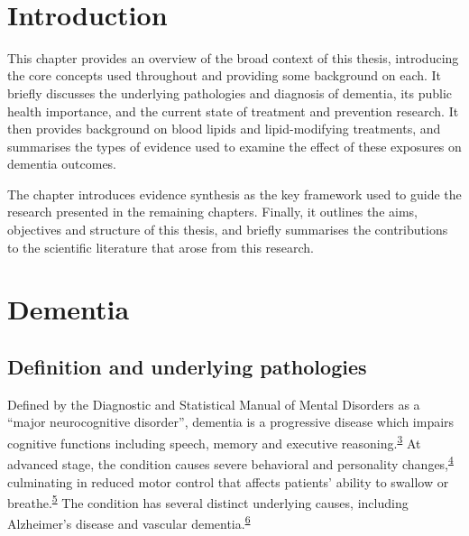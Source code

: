 \documentclass[a4paper, twoside]{templates/ociamthesis}
\begin{document}
~

\hypertarget{introduction}{%
\section{Introduction}\label{introduction}}

This chapter provides an overview of the broad context of this thesis, introducing the core concepts used throughout and providing some background on each. It briefly discusses the underlying pathologies and diagnosis of dementia, its public health importance, and the current state of treatment and prevention research. It then provides background on blood lipids and lipid-modifying treatments, and summarises the types of evidence used to examine the effect of these exposures on dementia outcomes.

The chapter introduces evidence synthesis as the key framework used to guide the research presented in the remaining chapters. Finally, it outlines the aims, objectives and structure of this thesis, and briefly summarises the contributions to the scientific literature that arose from this research.

\hypertarget{dementia}{%
\section{Dementia}\label{dementia}}

\hypertarget{underlying-pathologies}{%
\subsection{Definition and underlying pathologies}\label{underlying-pathologies}}

Defined by the Diagnostic and Statistical Manual of Mental Disorders as a ``major neurocognitive disorder'', dementia is a progressive disease which impairs cognitive functions including speech, memory and executive reasoning.\textsuperscript{\protect\hyperlink{ref-edition2013}{3}} At advanced stage, the condition causes severe behavioral and personality changes,\textsuperscript{\protect\hyperlink{ref-cerejeira2012}{4}} culminating in reduced motor control that affects patients' ability to swallow or breathe.\textsuperscript{\protect\hyperlink{ref-kumar2013}{5}} The condition has several distinct underlying causes, including Alzheimer's disease and vascular dementia.\textsuperscript{\protect\hyperlink{ref-burns2009}{6}}
\end{document}
